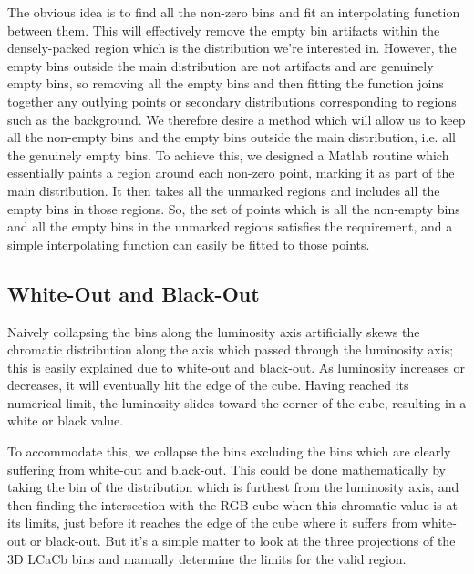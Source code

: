 The obvious idea is to find all the non-zero bins and fit an interpolating function between them. This will effectively remove the empty bin artifacts within the densely-packed region which is the distribution we're interested in. However, the empty bins outside the main distribution are not artifacts and are genuinely empty bins, so removing all the empty bins and then fitting the function joins together any outlying points or secondary distributions corresponding to regions such as the background. We therefore desire a method which will allow us to keep all the non-empty bins and the empty bins outside the main distribution, i.e. all the genuinely empty bins. To achieve this, we designed a Matlab routine which essentially paints a region around each non-zero point, marking it as part of the main distribution. It then takes all the unmarked regions and includes all the empty bins in those regions. So, the set of points which is all the non-empty bins and all the empty bins in the unmarked regions satisfies the requirement, and a simple interpolating function can easily be fitted to those points.


\subsection{White-Out and Black-Out}\label{sec:WhiteOutBlackOut}

Naively collapsing the bins along the luminosity axis artificially skews the chromatic distribution along the axis which passed through the luminosity axis; this is easily explained due to white-out and black-out. As luminosity increases or decreases, it will eventually hit the edge of the cube. Having reached its numerical limit, the luminosity slides toward the corner of the cube, resulting in a white or black value.

To accommodate this, we collapse the bins excluding the bins which are clearly suffering from white-out and black-out. This could be done mathematically by taking the bin of the distribution which is furthest from the luminosity axis, and then finding the intersection with the RGB cube when this chromatic value is at its limits, just before it reaches the edge of the cube where it suffers from white-out or black-out. But it's a simple matter to look at the three projections of the 3D LCaCb bins and manually determine the limits for the valid region.


